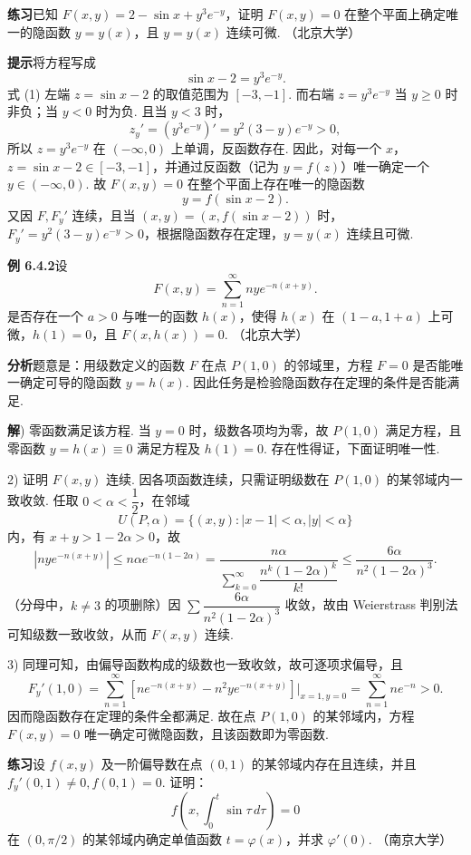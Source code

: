 \documentclass[UTF8,12pt,a4paper,fontset=fandol]{ctexart}
\begin{document}
\noindent\textbf{练习}\quad 已知 $F(x,y)=2-\sin x+y^3e^{-y}$，证明 $F(x,y)=0$ 在整个平面上确定唯一的隐函数 $y=y(x)$，且 $y=y(x)$ 连续可微. （北京大学）

\noindent\textbf{提示}\quad 将方程写成
\begin{equation}
  \sin x-2=y^3e^{-y}.
\end{equation}
式 (1) 左端 $z=\sin x-2$ 的取值范围为 $[-3,-1]$. 而右端 $z=y^3e^{-y}$ 当 $y\ge0$ 时非负；当 $y<0$ 时为负. 且当 $y<3$ 时，
\[
  z_y'=(y^3e^{-y})'=y^2(3-y)e^{-y}>0,
\]
所以 $z=y^3e^{-y}$ 在 $(-\infty,0)$ 上单调，反函数存在. 因此，对每一个 $x$，$z=\sin x-2\in[-3,-1]$，并通过反函数（记为 $y=f(z)$）唯一确定一个 $y\in(-\infty,0)$. 故 $F(x,y)=0$ 在整个平面上存在唯一的隐函数
\[
  y=f(\sin x-2).
\]
又因 $F,F_y'$ 连续，且当 $(x,y)=(x,f(\sin x-2))$ 时，$F_y'=y^2(3-y)e^{-y}>0$，根据隐函数存在定理，$y=y(x)$ 连续且可微.

\noindent\textbf{例 6.4.2}\quad 设
\[
  F(x,y)=\sum_{n=1}^\infty nye^{-n(x+y)}.
\]
是否存在一个 $a>0$ 与唯一的函数 $h(x)$，使得 $h(x)$ 在 $(1-a,1+a)$ 上可微，$h(1)=0$，且 $F(x,h(x))=0$. （北京大学）

\noindent\textbf{分析}\quad 题意是：用级数定义的函数 $F$ 在点 $P(1,0)$ 的邻域里，方程 $F=0$ 是否能唯一确定可导的隐函数 $y=h(x)$. 因此任务是检验隐函数存在定理的条件是否能满足.

\noindent\textbf{解}) 零函数满足该方程. 当 $y=0$ 时，级数各项均为零，故 $P(1,0)$ 满足方程，且零函数 $y=h(x)\equiv0$ 满足方程及 $h(1)=0$. 存在性得证，下面证明唯一性.

2) 证明 $F(x,y)$ 连续. 因各项函数连续，只需证明级数在 $P(1,0)$ 的某邻域内一致收敛. 任取 $0<\alpha<\dfrac12$，在邻域
\[
  U(P,\alpha)=\{(x,y):|x-1|<\alpha,|y|<\alpha\}
\]
内，有 $x+y>1-2\alpha>0$，故
\[
  |nye^{-n(x+y)}|
  \le n\alpha e^{-n(1-2\alpha)}
  =
  \frac{n\alpha}{\sum_{k=0}^\infty\dfrac{n^k(1-2\alpha)^k}{k!}}
  \le
  \frac{6\alpha}{n^2(1-2\alpha)^3}.
\]
（分母中，$k\ne3$ 的项删除）因 $\sum\dfrac{6\alpha}{n^2(1-2\alpha)^3}$ 收敛，故由 Weierstrass 判别法可知级数一致收敛，从而 $F(x,y)$ 连续.

3) 同理可知，由偏导函数构成的级数也一致收敛，故可逐项求偏导，且
\[
  F_y'(1,0)
  =
  \sum_{n=1}^\infty
  \left[
    ne^{-n(x+y)}-n^2ye^{-n(x+y)}
  \right]\bigg|_{x=1,y=0}
  =
  \sum_{n=1}^\infty ne^{-n}>0.
\]
因而隐函数存在定理的条件全都满足. 故在点 $P(1,0)$ 的某邻域内，方程 $F(x,y)=0$ 唯一确定可微隐函数，且该函数即为零函数.

\noindent\textbf{练习}\quad 设 $f(x,y)$ 及一阶偏导数在点 $(0,1)$ 的某邻域内存在且连续，并且 $f_y'(0,1)\ne0,f(0,1)=0$. 证明：
\[
  f\left(x,\int_0^t\sin\tau\,d\tau\right)=0
\]
在 $(0,\pi/2)$ 的某邻域内确定单值函数 $t=\varphi(x)$，并求 $\varphi'(0)$. （南京大学）
\end{document}

